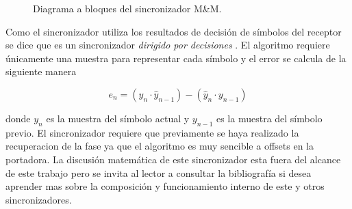 \begin{figure}[htp]
  \centering
  \vspace{0.5in}
  \vspace{0.3in}
  \caption{Diagrama a bloques del sincronizador M\&M. \protect\cite{meyr}}
  \label{fig:mm}
\end{figure}

Como el sincronizador utiliza los resultados de decisi\'on de s\'imbolos del receptor se dice que es un sincronizador
\emph{dirigido por decisiones} \cite{louis}. El algoritmo requiere \'unicamente una muestra para representar cada s\'imbolo y el
error se calcula de la siguiente manera

\begin{equation}
e_n=(y_n \cdot \hat{y}_{n-1}) - (\hat{y}_n \cdot y_{n-1})
\end{equation}

donde $y_n$ es la muestra del s\'imbolo actual y $y_{n-1}$ es la muestra del s\'imbolo previo. El sincronizador requiere que
previamente se haya realizado la recuperacion de la fase ya que el algoritmo es muy sencible a offsets en la portadora. La
discusi\'on matem\'atica de este sincronizador esta fuera del alcance de este trabajo pero se invita al lector a consultar la
bibliograf\'ia si desea aprender mas sobre la composici\'on y funcionamiento interno de este y otros sincronizadores. 

